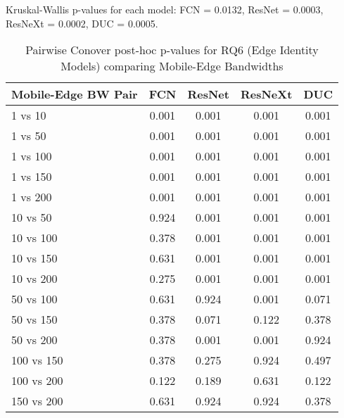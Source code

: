 \begin{table}[h]
\centering
\caption{Pairwise Conover post-hoc p-values for RQ6 (Edge Identity Models) comparing Mobile-Edge Bandwidths}
\label{tab:conover_edge_identity}
\smallskip
Kruskal-Wallis p-values for each model: FCN = 0.0132, ResNet = 0.0003, ResNeXt = 0.0002, DUC = 0.0005.
\begin{tabular}{lcccc}
\toprule
Mobile-Edge BW Pair & FCN & ResNet & ResNeXt & DUC \\
\midrule
1 vs 10 & 0.001 & 0.001 & 0.001 & 0.001 \\
1 vs 50 & 0.001 & 0.001 & 0.001 & 0.001 \\
1 vs 100 & 0.001 & 0.001 & 0.001 & 0.001 \\
1 vs 150 & 0.001 & 0.001 & 0.001 & 0.001 \\
1 vs 200 & 0.001 & 0.001 & 0.001 & 0.001 \\
10 vs 50 & 0.924 & 0.001 & 0.001 & 0.001 \\
10 vs 100 & 0.378 & 0.001 & 0.001 & 0.001 \\
10 vs 150 & 0.631 & 0.001 & 0.001 & 0.001 \\
10 vs 200 & 0.275 & 0.001 & 0.001 & 0.001 \\
50 vs 100 & 0.631 & 0.924 & 0.001 & 0.071 \\
50 vs 150 & 0.378 & 0.071 & 0.122 & 0.378 \\
50 vs 200 & 0.378 & 0.001 & 0.001 & 0.924 \\
100 vs 150 & 0.378 & 0.275 & 0.924 & 0.497 \\
100 vs 200 & 0.122 & 0.189 & 0.631 & 0.122 \\
150 vs 200 & 0.631 & 0.924 & 0.924 & 0.378 \\
\bottomrule
\end{tabular}
\end{table}
